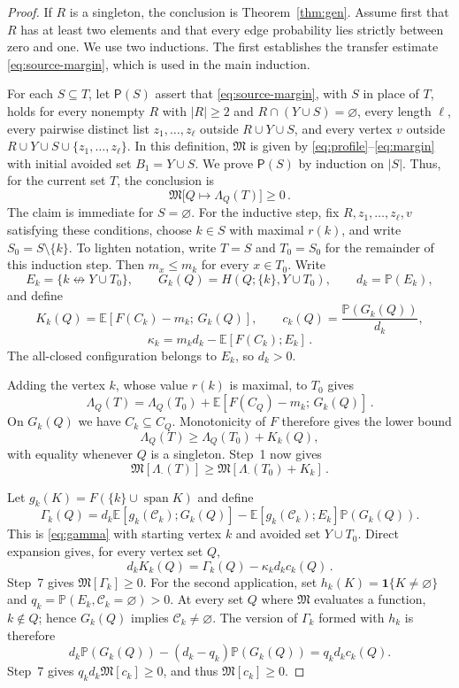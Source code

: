 \documentclass[11pt]{article}
\theoremstyle{definition}
\theoremstyle{remark}
\newcommand{\PP}{\mathbb P}
\newcommand{\EE}{\mathbb E}
\newcommand{\one}{\mathbf 1}
\newcommand{\ncon}{\nleftrightarrow}
\newcommand{\eC}{\mathcal C}
\DeclareMathOperator{\spn}{span}
\newcommand{\Marg}{\mathfrak M}
\begin{document}
\begin{proof}
If $R$ is a singleton, the conclusion is Theorem~\ref{thm:gen}. Assume first that $R$ has
at least two elements and that every edge probability lies strictly between zero and one.
We use two inductions. The first establishes the transfer estimate
\eqref{eq:source-margin}, which is used in the main induction.

For each $S\subseteq T$, let $\mathsf P(S)$ assert that
\eqref{eq:source-margin}, with $S$ in place of $T$, holds for every nonempty $R$ with
$|R|\geq2$ and $R\cap(Y\cup S)=\varnothing$, every length $\ell$, every pairwise distinct
list $z_1,\ldots,z_\ell$ outside $R\cup Y\cup S$, and every vertex $v$ outside
$R\cup Y\cup S\cup\{z_1,\ldots,z_\ell\}$. In this
definition, $\Marg$ is given by \eqref{eq:profile}--\eqref{eq:margin} with initial
avoided set $B_1=Y\cup S$. We prove $\mathsf P(S)$ by induction on $|S|$. Thus, for the
current set $T$, the conclusion is
\begin{equation}\label{eq:source-margin}
 \Marg\bigl[Q\mapsto\Lambda_Q(T)\bigr]\geq0\,.
\end{equation}
The claim is immediate for $S=\varnothing$. For the inductive step, fix
$R,z_1,\ldots,z_\ell,v$ satisfying these conditions, choose $k\in S$ with maximal
$r(k)$, and write
$S_0=S\setminus\{k\}$. To lighten notation, write $T=S$ and $T_0=S_0$ for the remainder
of this induction step. Then $m_x\leq m_k$ for every $x\in T_0$.
Write
\[
 E_k=\{k\ncon Y\cup T_0\},\qquad
 G_k(Q)=H(Q;\{k\},Y\cup T_0),\qquad d_k=\PP(E_k),
\]
and define
\[
 K_k(Q)=\EE[F(C_k)-m_k;\,G_k(Q)],\qquad
 c_k(Q)=\frac{\PP(G_k(Q))}{d_k},
\]
\[
 \kappa_k=m_kd_k-\EE[F(C_k);E_k]\,.
\]
The all-closed configuration belongs to $E_k$, so $d_k>0$.

Adding the vertex $k$, whose value $r(k)$ is maximal, to $T_0$ gives
\[
 \Lambda_Q(T)=\Lambda_Q(T_0)
   +\EE[F(C_Q)-m_k;\,G_k(Q)]\,.
\]
On $G_k(Q)$ we have $C_k\subseteq C_Q$. Monotonicity of $F$ therefore gives the lower
bound
\[
 \Lambda_Q(T)\geq\Lambda_Q(T_0)+K_k(Q),
\]
with equality whenever $Q$ is a singleton. Step~1 now gives
\begin{equation}\label{eq:source-peel-margin}
 \Marg[\Lambda_\cdot(T)]
 \geq \Marg[\Lambda_\cdot(T_0)+K_k]\,.
\end{equation}

Let $g_k(K)=F(\{k\}\cup\spn K)$ and define
\[
 \Gamma_k(Q)=d_k\EE[g_k(\eC_k);G_k(Q)]
 -\EE[g_k(\eC_k);E_k]\PP(G_k(Q)).
\]
This is \eqref{eq:gamma} with starting vertex $k$ and avoided set $Y\cup T_0$. Direct
expansion gives, for every vertex set $Q$,
\begin{equation}\label{eq:source-kappa-covariance}
 d_kK_k(Q)=\Gamma_k(Q)-\kappa_kd_kc_k(Q)\,.
\end{equation}
Step~7 gives $\Marg[\Gamma_k]\geq0$. For the second application, set
$h_k(K)=\one\{K\neq\varnothing\}$ and
$q_k=\PP(E_k,\eC_k=\varnothing)>0$. At every set $Q$ where $\Marg$ evaluates a function,
$k\notin Q$; hence $G_k(Q)$ implies $\eC_k\neq\varnothing$. The version of $\Gamma_k$
formed with $h_k$ is therefore
\[
 d_k\PP(G_k(Q))-(d_k-q_k)\PP(G_k(Q))
 =q_kd_kc_k(Q).
\]
Step~7 gives $q_kd_k\Marg[c_k]\geq0$, and thus $\Marg[c_k]\geq0$.


\end{proof}
\end{document}

